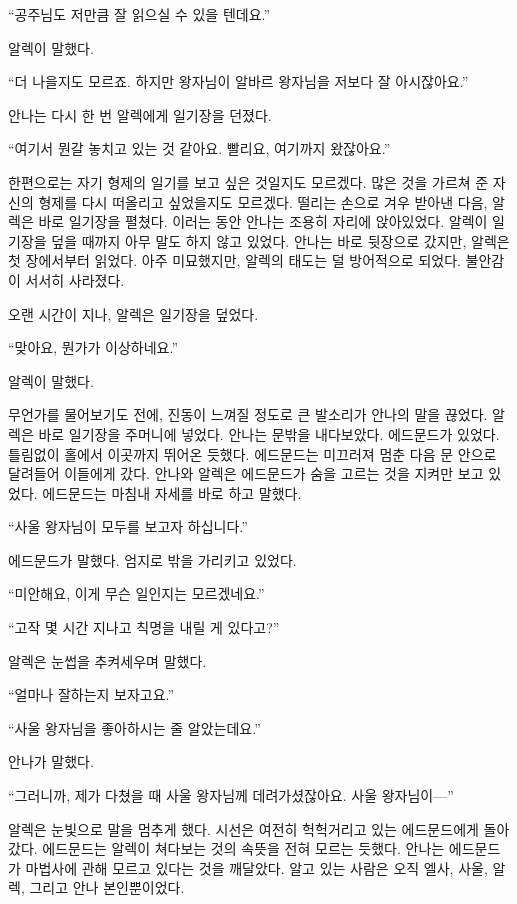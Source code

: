 ``공주님도 저만큼 잘 읽으실 수 있을 텐데요.''

알렉이 말했다.

``더 나을지도 모르죠. 하지만 왕자님이 알바르 왕자님을 저보다 잘 아시잖아요.''

안나는 다시 한 번 알렉에게 일기장을 던졌다.

``여기서 뭔갈 놓치고 있는 것 같아요. 빨리요, 여기까지 왔잖아요.''

한편으로는 자기 형제의 일기를 보고 싶은 것일지도 모르겠다. 많은 것을 가르쳐 준 자신의 형제를 다시 떠올리고 싶었을지도 모르겠다. 떨리는 손으로 겨우 받아낸 다음, 알렉은 바로 일기장을 펼쳤다. 이러는 동안 안나는 조용히 자리에 앉아있었다. 알렉이 일기장을 덮을 때까지 아무 말도 하지 않고 있었다. 안나는 바로 뒷장으로 갔지만, 알렉은 첫 장에서부터 읽었다. 아주 미묘했지만, 알렉의 태도는 덜 방어적으로 되었다. 불안감이 서서히 사라졌다.

오랜 시간이 지나, 알렉은 일기장을 덮었다.

``맞아요, 뭔가가 이상하네요.''

알렉이 말했다.

무언가를 물어보기도 전에, 진동이 느껴질 정도로 큰 발소리가 안나의 말을 끊었다. 알렉은 바로 일기장을 주머니에 넣었다. 안나는 문밖을 내다보았다. 에드문드가 있었다. 틀림없이 홀에서 이곳까지 뛰어온 듯했다. 에드문드는 미끄러져 멈춘 다음 문 안으로 달려들어 이들에게 갔다. 안나와 알렉은 에드문드가 숨을 고르는 것을 지켜만 보고 있었다. 에드문드는 마침내 자세를 바로 하고 말했다.

``사울 왕자님이 모두를 보고자 하십니다.''

에드문드가 말했다. 엄지로 밖을 가리키고 있었다.

``미안해요, 이게 무슨 일인지는 모르겠네요.''

``고작 몇 시간 지나고 칙명을 내릴 게 있다고?''

알렉은 눈썹을 추켜세우며 말했다.

``얼마나 잘하는지 보자고요.''

``사울 왕자님을 좋아하시는 줄 알았는데요.''

안나가 말했다.

``그러니까, 제가 다쳤을 때 사울 왕자님께 데려가셨잖아요. 사울 왕자님이—''

알렉은 눈빛으로 말을 멈추게 했다. 시선은 여전히 헉헉거리고 있는 에드문드에게 돌아갔다. 에드문드는 알렉이 쳐다보는 것의 속뜻을 전혀 모르는 듯했다. 안나는 에드문드가 마법사에 관해 모르고 있다는 것을 깨달았다. 알고 있는 사람은 오직 엘사, 사울, 알렉, 그리고 안나 본인뿐이었다.


